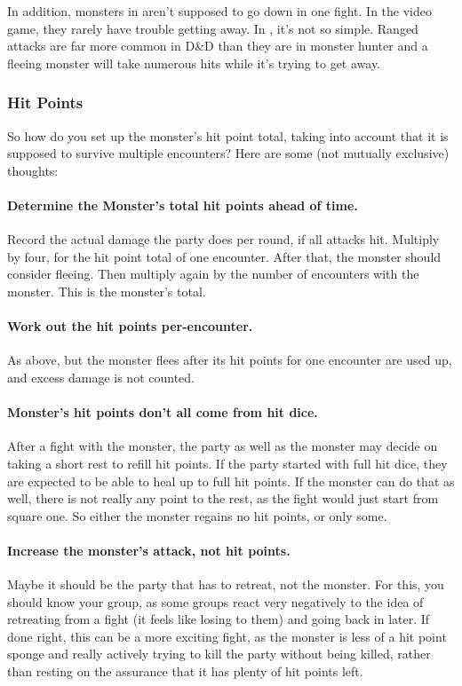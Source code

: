 In addition, monsters in \MH{} aren't supposed to go down in one fight. In the video game, they rarely have trouble getting away. In \DND{}, it's not so simple. Ranged attacks are far more common in D\&D than they are in monster hunter and a fleeing monster will take numerous hits while it's trying to get away.

\subsubsection{Hit Points}
So how do you set up the monster's hit point total, taking into account that it is supposed to survive multiple encounters? Here are some (not mutually exclusive) thoughts:
\paragraph{Determine the Monster's total hit points ahead of time.} Record the actual damage the party does per round, if all attacks hit. Multiply by four, for the hit point total of one encounter. After that, the monster should consider fleeing. Then multiply again by the number of encounters with the monster. This is the monster's total.
\paragraph{Work out the hit points per-encounter.} As above, but the monster flees after its hit points for one encounter are used up, and excess damage is not counted.
\paragraph{Monster's hit points don't all come from hit dice.} After a fight with the monster, the party as well as the monster may decide on taking a short rest to refill hit points. If the party started with full hit dice, they are expected to be able to heal up to full hit points. If the monster can do that as well, there is not really any point to the rest, as the fight would just start from square one. So either the monster regains no hit points, or only some.
\paragraph{Increase the monster's attack, not hit points.} Maybe it should be the party that has to retreat, not the monster. For this, you should know your group, as some groups react very negatively to the idea of retreating from a fight (it feels like losing to them) and going back in later. If done right, this can be a more exciting fight, as the monster is less of a hit point sponge and really actively trying to kill the party without being killed, rather than resting on the assurance that it has plenty of hit points left.

